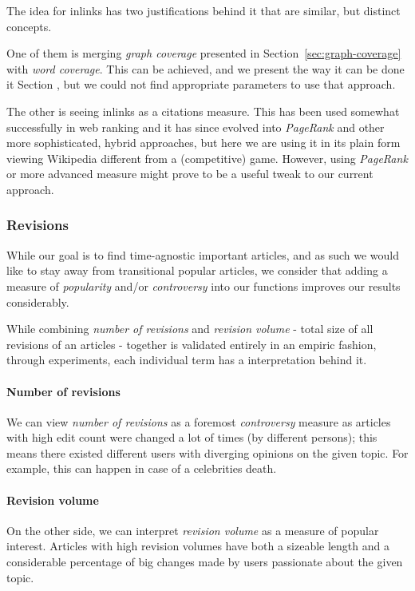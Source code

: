 The idea for inlinks has two justifications behind it that are similar, but
distinct concepts.

One of them is merging \emph{graph coverage} presented in
Section~\ref{sec:graph-coverage} with \emph{word coverage}.
This can be achieved, and we present the way it can be done it Section
, but we could not find
appropriate parameters to use that approach.

The other is seeing inlinks as a citations measure.
This has been used somewhat successfully in web ranking and it has since
evolved into \emph{PageRank} and other more sophisticated, hybrid approaches,
but here we are using it in its plain form viewing Wikipedia different from a
(competitive) game.
However, using \emph{PageRank} or more advanced measure might prove to be a
useful tweak to our current approach.

\subsubsection{Revisions}

While our goal is to find time-agnostic important articles, and as such we
would like to stay away from transitional popular articles, we consider that
adding a measure of \emph{popularity} and/or \emph{controversy} into our
functions improves our results considerably.

While combining \emph{number of revisions} and \emph{revision volume} - total
size of all revisions of an articles - together is validated entirely in an
empiric fashion, through experiments, each individual term has a interpretation
behind it.

\paragraph{Number of revisions}
We can view \emph{number of revisions} as a foremost \emph{controversy} measure
as articles with high edit count were changed a lot of times (by different
persons); this means there existed different users with diverging opinions on
the given topic. For example, this can happen in case of a celebrities death.

\paragraph{Revision volume}
On the other side, we can interpret \emph{revision volume} as a measure of
popular interest. Articles with high revision volumes have both a sizeable
length and a considerable percentage of big changes made by users passionate
about the given topic.

